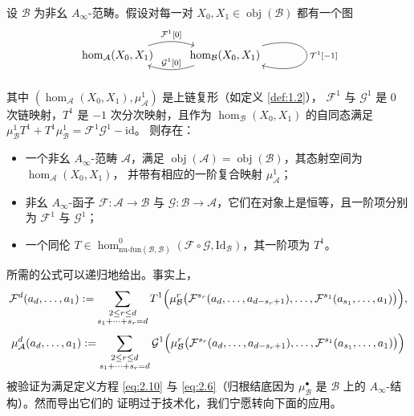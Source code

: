 \begin{Pro}[同调微扰引理]\label{pro:2.18}
设 $\mathcal B$ 为非幺 $A_\infty$-范畴。假设对每一对 $X_0,X_1\in\operatorname{obj}
(\mathcal B)$ 都有一个图
\begin{equation}\label{eq:2.22}
  \begin{tikzcd}
    \hom_{\mathcal A}(X_0,X_1)
      \arrow[r, bend left=18, "\mathcal F^1{[}0{]}"]
    & \hom_{\mathcal B}(X_0,X_1)
      \arrow[l, bend left=18, "\mathcal G^1{[}0{]}"']
      \arrow[loop right, "\mathcal T^1{[}-1{]}"]
  \end{tikzcd}
\end{equation}
其中 $(\hom_{\mathcal A}(X_0,X_1),\mu^1_{\mathcal A})$ 是上链复形（如定义 \ref{def:1.2}），
$\mathcal F^1$ 与 $\mathcal G^1$ 是 0 次链映射，$T^1$ 是 $-1$ 次分次映射，且作为
$\hom_{\mathcal B}(X_0,X_1)$ 的自同态满足
$\mu^1_{\mathcal B}T^1+T^1\mu^1_{\mathcal B}=\mathcal F^1\mathcal G^1-\mathrm{id}$。
则存在：
\begin{itemize}
  \item 一个非幺 $A_\infty$-范畴 $\mathcal A$，满足 $\operatorname{obj}(\mathcal A)=
        \operatorname{obj}(\mathcal B)$，其态射空间为 $\hom_{\mathcal A}(X_0,X_1)$，
        并带有相应的一阶复合映射 $\mu^1_{\mathcal A}$；
  \item 非幺 $A_\infty$-函子 $\mathcal F:\mathcal A\to\mathcal B$ 与
        $\mathcal G:\mathcal B\to\mathcal A$，它们在对象上是恒等，且一阶项分别为
        $\mathcal F^1$ 与 $\mathcal G^1$；
  \item 一个同伦 $T\in\hom^0_{\mathrm{nu\text{-}fun}(\mathcal B,\mathcal B)}
        (\mathcal F\circ\mathcal G,\mathrm{Id}_{\mathcal B})$，其一阶项为 $T^1$。
\end{itemize}
\end{Pro}

所需的公式可以递归地给出。事实上，
\[
  \mathcal F^d(a_d,\dots,a_1):=\sum_{\substack{2\le r\le d\\ s_1+\dots+s_r=d}}
  T^1\Bigl(\mu^r_{\mathcal B}\bigl(\mathcal F^{s_r}(a_d,\dots,a_{d-s_r+1}),\dots,
  \mathcal F^{s_1}(a_{s_1},\dots,a_1)\bigr)\Bigr),
\]
\[
  \mu^d_{\mathcal A}(a_d,\dots,a_1):=\sum_{\substack{2\le r\le d\\ s_1+\dots+s_r=d}}
  \mathcal G^1\Bigl(\mu^r_{\mathcal B}\bigl(\mathcal F^{s_r}(a_d,\dots,
  a_{d-s_r+1}),\dots,\mathcal F^{s_1}(a_{s_1},\dots,a_1)\bigr)\Bigr)
\]
被验证为满足定义方程 \eqref{eq:2.10} 与 \eqref{eq:2.6}（归根结底因为
$\mu^\bullet_{\mathcal B}$ 是 $\mathcal B$ 上的 $A_\infty$-结构）。然而导出它们的
证明过于技术化，我们宁愿转向下面的应用。


